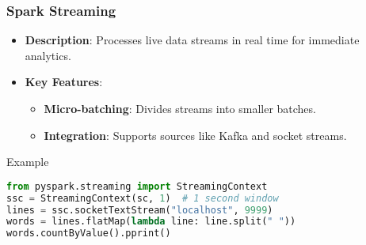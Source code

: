 \documentclass[aspectratio=169]{beamer}
\begin{document}
\begin{frame}[fragile]
    \frametitle{Spark Streaming}
    \begin{itemize}
        \item \textbf{Description}: Processes live data streams in real time for immediate analytics.
        \item \textbf{Key Features}:
            \begin{itemize}
                \item \textbf{Micro-batching}: Divides streams into smaller batches.
                \item \textbf{Integration}: Supports sources like Kafka and socket streams.
            \end{itemize}
    \end{itemize}
    \begin{block}{Example}
        \begin{lstlisting}[language=Python]
from pyspark.streaming import StreamingContext
ssc = StreamingContext(sc, 1)  # 1 second window
lines = ssc.socketTextStream("localhost", 9999)
words = lines.flatMap(lambda line: line.split(" "))
words.countByValue().pprint()
        \end{lstlisting}
    \end{block}
\end{frame}
\end{document}
